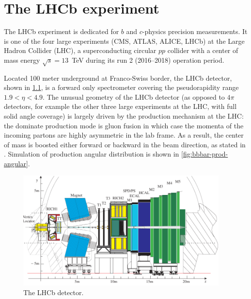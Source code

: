 \chapter{The LHCb experiment}
\label{ref:detector}

The LHCb experiment is dedicated for $b$ and $c$-physics precision measurements.
It is one of the four large experiments
(CMS, ATLAS, ALICE, LHCb) at the Large Hadron Collider (LHC),
a superconducting circular $pp$ collider with a center of mass energy
$\sqrt{s} = 13$~TeV during its run 2 (2016--2018) operation period.

Located 100 meter underground at Franco-Swiss border,
the LHCb detector,
shown in \cref{fig:lhcb-detector},
is a forward only spectrometer covering the pseudorapidity range
$1.9 < \eta < 4.9$.
The unusual geometry of the LHCb detector
(as opposed to $4\pi$ detectors,
for example the other three large experiments at the LHC,
with full solid angle coverage)
is largely driven by the \bbbar production mechanism at the LHC:
the dominate production mode is gluon fusion in which case the momenta of the
incoming partons are highly asymmetric in the lab frame.
As a result, the \bbbar center of mass is boosted either forward or backward
in the beam direction, as stated in \cite{Altarelli_2008}.
Simulation of \bbbar production angular distribution is shown in
\cref{fig:bbbar-prod-angular}.

\begin{figure}[!htb]
    \centering
    \includegraphics[width=0.95\textwidth]{./figs-detector/lhcb_detector_view.pdf}
    \caption{The LHCb detector.}
    \label{fig:lhcb-detector}
\end{figure}


